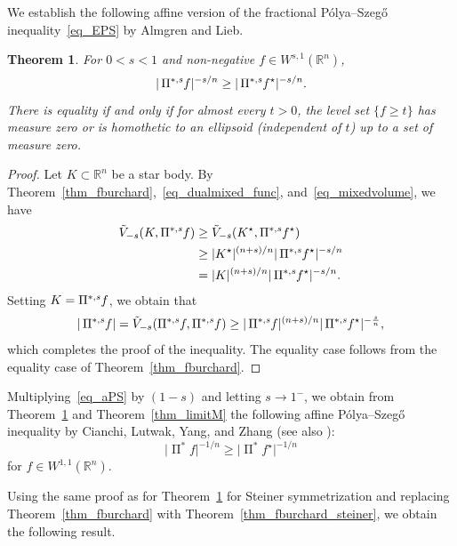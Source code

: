 \documentclass{amsart}
\newtheorem{theorem}{Theorem}
\newcommand{\opp}{\operatorname{\Pi}^*\!}
\newcommand{\ofpp}[1]{\operatorname{\Pi^{\ast,{\it #1}}}\!}
\newcommand{\vol}[1]{ \vert #1\vert}
\begin{document}
We establish the following affine version of the fractional P\'olya--Szeg\H o
inequality~\eqref{eq_EPS} by Almgren and Lieb.

\begin{theorem}%
\label{thm_aPS}
For $0<s<1$ and non-negative $f\in W^{s,1}(\mathbb R^{n})$,
%
\begin{equation}
\label{eq_aPS}
\vol{\ofpp{s} f}^{-s/n} \geq \vol{\ofpp{s} f^{\star}}^{-s/n}.
\end{equation}
%
There is equality if and only if for almost every $t>0$, the level set
$\{f \ge t\}$ has measure zero or is homothetic to an ellipsoid (independent
of $t$) up to a set of measure zero.
\end{theorem}

\begin{proof}
Let $K\subset \mathbb R^{n}$ be a star body. By Theorem~\ref{thm_fburchard},~\eqref{eq_dualmixed_func}, and~\eqref{eq_mixedvolume}, we have
%
\begin{align}
\tilde V_{-s} (K, \ofpp sf) &\geq \tilde V_{-s} (K^{\star}, \ofpp sf^{
\star})
\nonumber \\
&\geq \vol{K^{\star}}^{({n+s})/{n}} \vol{\ofpp sf^{\star}}^{- s/n}
\nonumber \\
&= \vol{K}^{({n+s})/{n}} \vol{\ofpp sf^{\star}}^{- s/n}.
\nonumber \end{align}
%
Setting $K = \ofpp sf$, we obtain that
%
\begin{align}
\vol{\ofpp sf} = \tilde V_{-s} (\ofpp sf, \ofpp sf) \geq
\vol{\ofpp sf}^{({n+s})/{n}} \vol{\ofpp sf^{\star}}^{-\frac {s}{n}},
\nonumber \end{align}
%
which completes the proof of the inequality. The equality case follows
from the equality case of Theorem~\ref{thm_fburchard}.
\end{proof}

Multiplying~\eqref{eq_aPS} by $(1-s)$ and letting $s\to 1^{-}$, we obtain
from Theorem~\ref{thm_aPS} and Theorem~\ref{thm_limitM} the following affine
P\'olya--Szeg\H o inequality by Cianchi, Lutwak, Yang, and Zhang
\cite{CLYZ2009} (see also \cite{Nguyen16}):
%
\begin{equation}
\vol{\opp f}^{-1/n} \geq \vol{\opp f^{\star}}^{-1/n}
\nonumber \end{equation}
%
for $f\in W^{1,1}(\mathbb R^{n})$.

Using the same proof as for Theorem~\ref{thm_aPS} for Steiner symmetrization
and replacing Theorem~\ref{thm_fburchard} with Theorem~\ref{thm_fburchard_steiner}, we obtain the following result.
\end{document}
